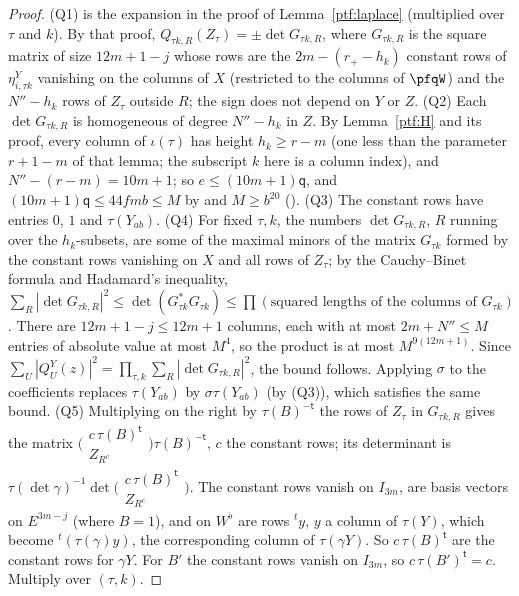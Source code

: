 \documentclass[10pt]{amsart}
\theoremstyle{definition}
\theoremstyle{remark}
\begin{document}
\begin{proof}
(Q1) is the expansion in the proof of Lemma~\ref{ptf:laplace} (multiplied over $\tau$ and $k$). By that proof,
$Q_{\tau k,R}(Z_\tau)=\pm\det G_{\tau k,R}$, where $G_{\tau k,R}$ is the square matrix of size $12m+1-j$ whose
rows are the $2m-(r_+-h_k)$ constant rows of $\eta^Y_{i,\tau k}$ vanishing on the columns of $X$ (restricted to the
columns of $\pfqW$) and the $N''-h_k$ rows of $Z_\tau$ outside $R$; the sign does not depend on $Y$ or $Z$.
(Q2) Each $\det G_{\tau k,R}$ is homogeneous of degree $N''-h_k$ in $Z$. By Lemma~\ref{ptf:H} and its proof,
every column of $\iota(\tau)$ has height $h_k\ge r-m$ (one less than the parameter $r+1-m$ of that lemma; the subscript $k$ here is a column index), and $N''-(r-m)=10m+1$; so $e\le(10m+1)\mathsf q$, and $(10m+1)\mathsf q\le44fmb\le M$ by
{\cite[(36) and~(38)]{P46}} and $M\ge b^{20}$ ({\cite[Lemma~13.4]{P46}}). (Q3) The constant
rows have entries $0$, $1$ and $\tau(Y_{ab})$. (Q4) For fixed $\tau,k$, the numbers $\det G_{\tau k,R}$, $R$ running
over the $h_k$-subsets, are some of the maximal minors of the matrix $G_{\tau k}$ formed by the constant rows
vanishing on $X$ and all rows of $Z_\tau$; by the Cauchy--Binet formula and Hadamard's inequality,
$\sum_R|\det G_{\tau k,R}|^2\le\det(G^*_{\tau k}G_{\tau k})\le\prod(\text{squared lengths of the columns of }G_{\tau k})$.
There are $12m+1-j\le12m+1$ columns, each with at most $2m+N''\le M$ entries of absolute value at most $M^4$, so
the product is at most $M^{9(12m+1)}$. Since $\sum_U|Q^Y_U(z)|^2=\prod_{\tau,k}\sum_R|\det G_{\tau k,R}|^2$, the
bound follows. Applying $\sigma$ to the coefficients replaces $\tau(Y_{ab})$ by $\sigma\tau(Y_{ab})$ (by (Q3)), which
satisfies the same bound. (Q5) Multiplying on the right by $\tau(B)^{-\mathsf t}$ the rows of $Z_\tau$ in $G_{\tau k,R}$
gives the matrix $\bigl(\begin{smallmatrix}c\,\tau(B)^{\mathsf t}\\ Z_{R^c}\end{smallmatrix}\bigr)\tau(B)^{-\mathsf t}$, $c$ the
constant rows; its determinant is $\tau(\det\gamma)^{-1}\det\bigl(\begin{smallmatrix}c\,\tau(B)^{\mathsf t}\\ Z_{R^c}
\end{smallmatrix}\bigr)$. The constant rows vanish on $I_{3m}$, are basis vectors on $E^{3m-j}$ (where $B=1$), and on
$W^\flat$ are rows ${}^ty$, $y$ a column of $\tau(Y)$, which become ${}^t(\tau(\gamma)y)$, the corresponding column of
$\tau(\gamma Y)$. So $c\,\tau(B)^{\mathsf t}$ are the constant rows for $\gamma Y$. For $B'$ the constant rows vanish on
$I_{3m}$, so $c\,\tau(B')^{\mathsf t}=c$. Multiply over $(\tau,k)$.
\end{proof}
\end{document}
